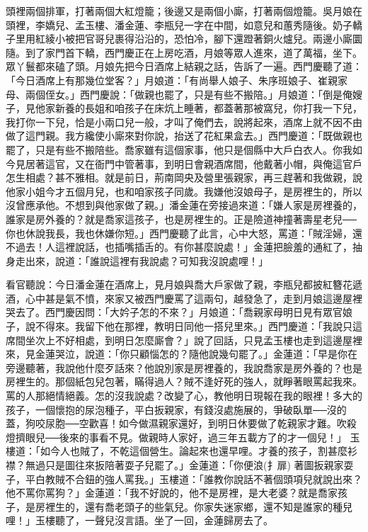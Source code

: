 頭裡兩個排軍，打著兩個大紅燈籠；後邊又是兩個小廝，打著兩個燈籠。吳月娘在頭裡，李嬌兒、孟玉樓、潘金蓮、李瓶兒一字在中間，如意兒和蕙秀隨後。奶子轎子里用紅綾小被把官哥兒裹得沿沿的，恐怕冷，腳下還蹬著銅火爐兒。兩邊小廝圜隨。到了家門首下轎，西門慶正在上房吃酒，月娘等眾人進來，道了萬福，坐下。眾丫鬟都來磕了頭。月娘先把今日酒席上結親之話，告訴了一遍。西門慶聽了道：「今日酒席上有那幾位堂客？」月娘道：「有尚舉人娘子、朱序班娘子、崔親家母、兩個侄女。」西門慶說：「做親也罷了，只是有些不搬陪。」月娘道：「倒是俺嫂子，見他家新養的長姐和咱孩子在床炕上睡著，都蓋著那被窩兒，你打我一下兒，我打你一下兒，恰是小兩口兒一般，才叫了俺們去，說將起來，酒席上就不因不由做了這門親。我方纔使小廝來對你說，抬送了花紅果盒去。」西門慶道：「既做親也罷了，只是有些不搬陪些。喬家雖有這個家事，他只是個縣中大戶白衣人。你我如今見居著這官，又在衙門中管著事，到明日會親酒席間，他戴著小帽，與俺這官戶怎生相處？甚不雅相。就是前日，荊南岡央及營里張親家，再三趕著和我做親，說他家小姐今才五個月兒，也和咱家孩子同歲。我嫌他沒娘母子，是房裡生的，所以沒曾應承他。不想到與他家做了親。」潘金蓮在旁接過來道：「嫌人家是房裡養的，誰家是房外養的？就是喬家這孩子，也是房裡生的。正是險道神撞著壽星老兒──你也休說我長，我也休嫌你短。」西門慶聽了此言，心中大怒，罵道：「賊淫婦，還不過去！人這裡說話，也插嘴插舌的。有你甚麼說處！」金蓮把臉羞的通紅了，抽身走出來，說道：「誰說這裡有我說處？可知我沒說處哩！」

看官聽說：今日潘金蓮在酒席上，見月娘與喬大戶家做了親，李瓶兒都披紅簪花遞酒，心中甚是氣不憤，來家又被西門慶罵了這兩句，越發急了，走到月娘這邊屋裡哭去了。西門慶因問：「大妗子怎的不來？」月娘道：「喬親家母明日見有眾官娘子，說不得來。我留下他在那裡，教明日同他一搭兒里來。」西門慶道：「我說只這席間坐次上不好相處，到明日怎麼廝會？」說了回話，只見孟玉樓也走到這邊屋裡來，見金蓮哭泣，說道：「你只顧惱怎的？隨他說幾句罷了。」金蓮道：「早是你在旁邊聽著，我說他什麼歹話來？他說別家是房裡養的，我說喬家是房外養的？也是房裡生的。那個紙包兒包著，瞞得過人？賊不逢好死的強人，就睜著眼罵起我來。罵的人那絕情絕義。怎的沒我說處？改變了心，教他明日現報在我的眼裡！多大的孩子，一個懷抱的尿泡種子，平白扳親家，有錢沒處施展的，爭破臥單──沒的蓋，狗咬尿胞──空歡喜！如今做濕親家還好，到明日休要做了乾親家才難。吹殺燈擠眼兒──後來的事看不見。做親時人家好，過三年五載方了的才一個兒！」 玉樓道：「如今人也賊了，不乾這個營生。論起來也還早哩。才養的孩子，割甚麼衫襟？無過只是圖往來扳陪著耍子兒罷了。」金蓮道：「你便浪(扌扉) 著圖扳親家耍子，平白教賊不合鈕的強人罵我。」玉樓道：「誰教你說話不著個頭項兒就說出來？他不罵你罵狗？」金蓮道：「我不好說的，他不是房裡，是大老婆？就是喬家孩子，是房裡生的，還有喬老頭子的些氣兒。你家失迷家鄉，還不知是誰家的種兒哩！」玉樓聽了，一聲兒沒言語。坐了一回，金蓮歸房去了。

